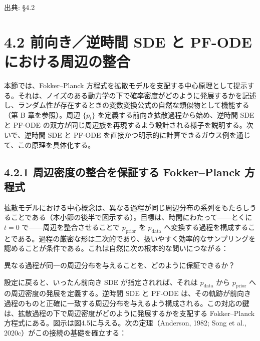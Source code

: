 

{\color{gray}\footnotesize 出典: §4.2\par}
\vspace{0.2em}

\section*{4.2 前向き／逆時間 SDE と PF-ODE における周辺の整合}


本節では、Fokker–Planck 方程式を拡散モデルを支配する中心原理として提示する。それは、ノイズのある動力学の下で確率密度がどのように発展するかを記述し、ランダム性が存在するときの変数変換公式の自然な類似物として機能する（第 B 章を参照）。周辺 $\{p_t\}$ を定義する前向き拡散過程から始め、逆時間 SDE と PF-ODE の双方が同じ周辺族を再現するよう設計される様子を説明する。次いで、逆時間 SDE と PF-ODE を直接かつ明示的に計算できるガウス例を通じて、この原理を具体化する。

\subsection*{4.2.1 周辺密度の整合を保証する Fokker–Planck 方程式}


拡散モデルにおける中心概念は、異なる過程が同じ周辺分布の系列をもたらしうることである（本小節の後半で図示する）。目標は、時間にわたって——とくに $t=0$ で——周辺を整合させることで $p_{\mathrm{prior}}$ を $p_{\mathrm{data}}$ へ変換する過程を構成することである。過程の厳密な形は二次的であり、扱いやすく効率的なサンプリングを認めることが条件である。これは自然に次の根本的な問いにつながる：

\begin{propositionbox}[問い 4.2.1]
異なる過程が同一の周辺分布を与えることを、どのように保証できるか？
\end{propositionbox}


設定に戻ると、いったん前向き SDE が指定されれば、それは $p_{\mathrm{data}}$ から $p_{\mathrm{prior}}$ への周辺密度の発展を定義する。逆時間 SDE と PF-ODE は、その軌跡が前向き過程のものと正確に一致する周辺分布を与えるよう構成される。この対応の鍵は、拡散過程の下で周辺密度がどのように発展するかを支配する Fokker–Planck 方程式にある。図示は図4.5に与える。次の定理（Anderson, 1982; Song et al., 2020c）がこの接続の基礎を確立する：



